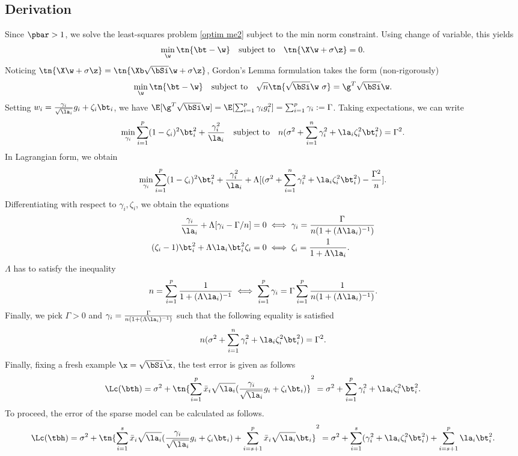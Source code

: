 \subsection{Derivation}
Since $\pbar>1$, we solve the least-squares problem  \eqref{optim me2} subject to the min norm constraint. Using change of variable, this yields
\begin{align}
\min_{\w} \tn{\bt-\w}\quad\text{subject to}\quad \tn{\X\w+\sigma \z}=0.
\end{align}
Noticing $\tn{\X\w+\sigma \z}=\tn{\Xb\sqrt{\bSi}\w+\sigma \z}$, Gordon's Lemma formulation takes the form (non-rigorously)
\begin{align}
\min_{\w} \tn{\bt-\w}\quad\text{subject to}\quad \sqrt{n}\tn{\sqrt{\bSi}\w~{\sigma}}=\g^T\sqrt{\bSi}\w.
\end{align}
Setting $w_i=\frac{\gamma_i}{\sqrt{\la_i}}g_i+\zeta_i\bt_i$, we have $\E[\g^T\sqrt{\bSi}\w]=\E[\sum_{i=1}^p\gamma_ig_i^2]=\sum_{i=1}^p\gamma_i:=\Gamma$. Taking expectations, we can write
\begin{align}
\min_{\gamma_i} \sum_{i=1}^p (1-\zeta_i)^2\bt_i^2+\frac{\gamma_i^2}{\la_i} \quad\text{subject to}\quad n(\sigma^2+\sum_{i=1}^n \gamma_i^2+\la_i\zeta_i^2\bt_i^2)=\Gamma^2.
\end{align}
In Lagrangian form, we obtain
\begin{align}
\min_{\gamma_i} \sum_{i=1}^p (1-\zeta_i)^2\bt_i^2+\frac{\gamma_i^2}{\la_i} +\Lambda [(\sigma^2+\sum_{i=1}^n \gamma_i^2+\la_i\zeta_i^2\bt_i^2)-\frac{\Gamma^2}{n}].
\end{align}
Differentiating with respect to $\gamma_i,\zeta_i$, we obtain the equations
\begin{align}
\frac{\gamma_i}{\la_i}+\Lambda [\gamma_i-\Gamma/n]=0&\iff \gamma_i=\frac{\Gamma}{n(1+(\Lambda\la_i)^{-1})}\\
(\zeta_i-1)\bt_i^2+\Lambda \la_i\bt_i^2\zeta_i=0&\iff \zeta_i=\frac{1}{1+\Lambda \la_i}.
\end{align}
$\Lambda$ has to satisfy the inequality
\begin{align}
n=\sum_{i=1}^p\frac{1}{1+(\Lambda\la_i)^{-1}}\iff \sum_{i=1}^p\gamma_i=\Gamma\sum_{i=1}^p\frac{1}{n(1+(\Lambda\la_i)^{-1})}.
\end{align}
Finally, we pick $\Gamma>0$ and $\gamma_i=\frac{\Gamma}{n(1+(\Lambda \la_i)^{-1})}$ such that the following equality is satisfied
\[
n(\sigma^2+\sum_{i=1}^n \gamma_i^2+\la_i\zeta_i^2\bt_i^2)=\Gamma^2.
\]
Finally, fixing a fresh example $\x=\sqrt{\bSi}\bar{\x}$, the test error is given as follows
\[
\Lc(\bth)=\sigma^2+\tn{\sum_{i=1}^p \bar{x}_i\sqrt{\la_i}(\frac{\gamma_i}{\sqrt{\la_i}}g_i+\zeta_i\bt_i)}^2=\sigma^2+\sum_{i=1}^p\gamma_i^2+\la_i\zeta_i^2\bt_i^2.
\]
To proceed, the error of the sparse model can be calculated as follows.
\[
\Lc(\tbh)=\sigma^2+\tn{\sum_{i=1}^s\bar{x}_i \sqrt{\la_i}(\frac{\gamma_i}{\sqrt{\la_i}}g_i+\zeta_i\bt_i)+\sum_{i=s+1}^p\bar{x}_i\sqrt{\la_i}\bt_i}^2=\sigma^2+\sum_{i=1}^s(\gamma_i^2+\la_i\zeta_i^2\bt_i^2)+\sum_{i=s+1}^p\la_i\bt_i^2.
\]


